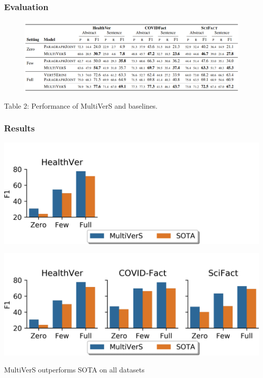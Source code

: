 \documentclass[13.5pt,aspecratio=169, xcolor=dvipsnames]{beamer}
\begin{document}
\begin{frame}
    \onehalfspacing
        \frametitle{Evaluation}
        \begin{figure}[h]
            \centering
            \includegraphics[width=\textwidth]{Results.png}
        \end{figure}
        \begin{center}
            Table 2: Performance of MultiVerS and baselines.
        \end{center}
    
\end{frame}

\begin{frame}
    \onehalfspacing
        \frametitle{Results}

         {
            \vspace*{-2pt}
            \hspace{1pt}
            \includegraphics[width=\textwidth]{Result_0.png}

        }
         {
            \includegraphics[width=\textwidth]{Result_1.png}

            \begin{minipage}{0.6\textwidth}
                \begin{block}{}
                    \vspace*{0.5em}MultiVerS outperforms SOTA on all datasets
                \end{block}
            \end{minipage}
        }
       

    
\end{frame}
\end{document}

